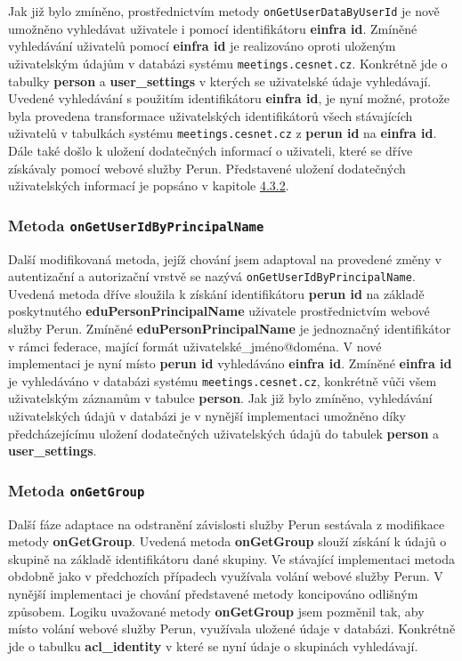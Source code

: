 \documentclass[
  printed, %
  twoside, %
  table,   %
  nolof,     %
  nolot,     %
]{fithesis3}
\begin{document}
\par 

Jak již bylo zmíněno, prostřednictvím metody \texttt{onGetUserDataByUserId} je nově umožněno vyhledávat uživatele i pomocí identifikátoru \textbf{einfra id}. Zmíněné vyhledávání uživatelů pomocí \textbf{einfra id} je realizováno oproti uloženým uživatelským údajům v databázi systému \texttt{meetings.cesnet.cz}. Konkrétně jde o tabulky \textbf{person} a \textbf{user\_settings} v kterých se uživatelské údaje vyhledávají. Uvedené vyhledávání s použitím identifikátoru \textbf{einfra id}, je nyní možné, protože byla provedena transformace uživatelských identifikátorů všech stávajících uživatelů v tabulkách systému \texttt{meetings.cesnet.cz} z \textbf{perun id} na \textbf{einfra id}. Dále také došlo k uložení dodatečných informací o uživateli, které se dříve získávaly pomocí webové služby Perun. Představené uložení dodatečných uživatelských informací je popsáno v kapitole \hyperref[zpracovaniAUlozeniPerun]{4.3.2}. 
\subsubsection{Metoda \texttt{onGetUserIdByPrincipalName}}

Další modifikovaná metoda, jejíž chování jsem adaptoval na provedené změny v autentizační a autorizační vrstvě se nazývá \texttt{onGetUserIdByPrincipalName}. Uvedená metoda dříve sloužila k získání identifikátoru \textbf{perun id} na základě poskytnutého \textbf{eduPersonPrincipalName} uživatele prostřednictvím webové služby Perun. Zmíněné \textbf{eduPersonPrincipalName} je jednoznačný identifikátor v rámci federace, mající formát uživatelské\_jméno@doména. V nové implementaci je nyní místo \textbf{perun id} vyhledáváno \textbf{einfra id}. Zmíněné \textbf{einfra id} je vyhledáváno v databázi systému \texttt{meetings.cesnet.cz}, konkrétně vůči všem uživatelským záznamům v tabulce \textbf{person}. Jak již bylo zmíněno, vyhledávání uživatelských údajů v databázi je v nynější implementaci umožněno díky předcházejícímu uložení dodatečných uživatelských údajů do tabulek \textbf{person} a \textbf{user\_settings}.

\subsubsection{Metoda \texttt{onGetGroup}}

Další fáze adaptace na odstranění závislosti služby Perun sestávala z modifikace metody \textbf{onGetGroup}. Uvedená metoda \textbf{onGetGroup} slouží získání k údajů o skupině na základě identifikátoru dané skupiny. Ve stávající implementaci metoda obdobně jako v předchozích případech využívala volání webové služby Perun. V nynější implementaci je chování představené metody koncipováno odlišným způsobem. Logiku uvažované metody \textbf{onGetGroup} jsem pozměnil tak, aby místo volání webové služby Perun, využívala uložené údaje v databázi. Konkrétně jde o tabulku \textbf{acl\_identity} v které se nyní údaje o skupinách vyhledávají. 
\end{document}
